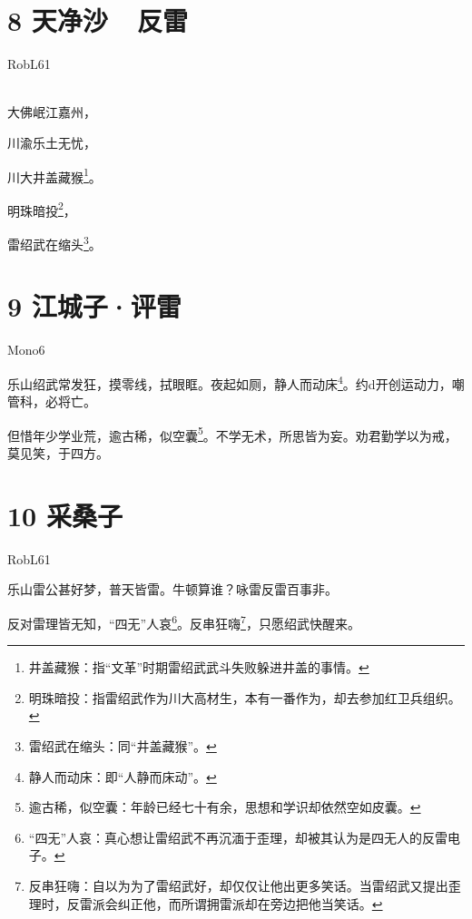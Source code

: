 \documentclass[UTF8,12pt,oneside]{ctexbook}
\begin{document}
    \section{8 天净沙\ \ 反雷}
    \begin{center}
        RobL61
        
        ~\\
        
        大佛岷江嘉州，
        
        川渝乐土无忧，
        
        川大井盖藏猴\footnote{井盖藏猴：指“文革”时期雷绍武武斗失败躲进井盖的事情。}。
       
        明珠暗投\footnote{明珠暗投：指雷绍武作为川大高材生，本有一番作为，却去参加红卫兵组织。}，
        
        雷绍武在缩头\footnote{雷绍武在缩头：同“井盖藏猴”。}。
    \end{center}
    
    \newpage

    \section{9 江城子·评雷}
    \begin{center}
        Mono6
        
    \end{center}
       
       乐山绍武常发狂，摸零线，拭眼眶。夜起如厕，静人而动床\footnote{静人而动床：即“人静而床动”。}。约d开创运动力，嘲管科，必将亡。    
       
       但惜年少学业荒，逾古稀，似空囊\footnote{逾古稀，似空囊：年龄已经七十有余，思想和学识却依然空如皮囊。}。不学无术，所思皆为妄。劝君勤学以为戒，莫见笑，于四方。
    ~\\

    \section{10 采桑子}
    \begin{center}
        RobL61
    \end{center}
       
        乐山雷公甚好梦，普天皆雷。牛顿算谁？咏雷反雷百事非。
       
       反对雷理皆无知，“四无”人哀\footnote{“四无”人哀：真心想让雷绍武不再沉湎于歪理，却被其认为是四无人的反雷电子。}。反串狂嗨\footnote{反串狂嗨：自以为为了雷绍武好，却仅仅让他出更多笑话。当雷绍武又提出歪理时，反雷派会纠正他，而所谓拥雷派却在旁边把他当笑话。}，只愿绍武快醒来。
       
\end{document}
